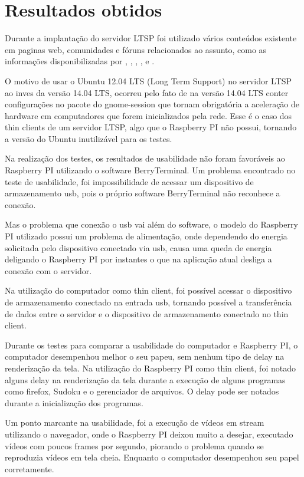 \documentclass[
	12pt,				%
	openright,			%
	twoside,			%
	a4paper,			%
	chapter=TITLE,		%
	english,			%
	brazil				%
	]{abntex2}
\begin{document}
\chapter{Resultados obtidos}
\label{result}

Durante a implantação do servidor LTSP foi utilizado vários conteúdos existente em paginas web, comunidades e fóruns relacionados ao assunto, como as informações disponibilizadas por , , , ,  e .

O motivo de usar o Ubuntu 12.04 LTS (Long Term Support) no servidor LTSP ao inves da versão 14.04 LTS, ocorreu pelo fato de na versão 14.04 LTS conter configurações no pacote do gnome-session que tornam obrigatória a aceleração de hardware em computadores que forem inicializados pela rede. Esse é o caso dos thin clients de um servidor LTSP, algo que o Raspberry PI não possui, tornando a versão do Ubuntu inutilizável para os testes.

Na realização dos testes, os resultados de usabilidade não foram favoráveis ao Raspberry PI utilizando o software BerryTerminal. Um problema encontrado no teste de usabilidade, foi impossibilidade de acessar um dispositivo de armazenamento usb, pois o próprio software BerryTerminal não reconhece a conexão.

Mas o problema que conexão o usb vai além do software, o modelo do Raspberry PI utilizado possui um problema de alimentação, onde dependendo do energia solicitada pelo dispositivo conectado via usb, causa uma queda de energia deligando o Raspberry PI por instantes o que na aplicação atual desliga a conexão com o servidor.

Na utilização do computador como thin client, foi possível acessar o dispositivo de armazenamento conectado na entrada usb, tornando possível  a transferência de dados entre o servidor e o dispositivo de armazenamento conectado no thin client.

Durante os testes para comparar a usabilidade do computador e Raspberry PI, o computador desempenhou melhor o seu papeu, sem nenhum tipo de delay na renderização da tela.  Na utilização do Raspberry PI como thin client, foi notado alguns delay na renderização da tela durante a execução de alguns programas como firefox, Sudoku e o gerenciador de arquivos. O delay pode ser notados durante a inicialização dos programas.

Um ponto marcante na usabilidade, foi a execução de vídeos em stream utilizando o navegador, onde o Raspberry PI deixou muito a desejar, executado vídeos com poucos frames por segundo, piorando o problema quando se reproduzia vídeos em tela cheia. Enquanto o computador desempenhou seu papel corretamente.
\end{document}

